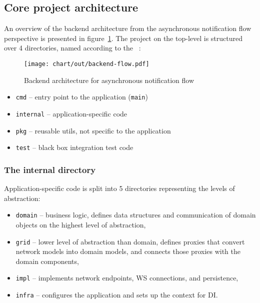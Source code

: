 \subsection{Core project architecture}\label{sec:core-project-architecture}

An overview of the backend architecture
from the asynchronous notification flow perspective
is presented in figure~\ref{fig:high-level-backend-flow}.
The project on the top-level is structured over 4 directories,
named according to
the ~\cite{quest_standard_2022}:

\begin{figure}[h]
      \centering
      \texttt{[image: chart/out/backend-flow.pdf]}
      \caption{Backend architecture for asynchronous notification flow}
      \label{fig:high-level-backend-flow}
\end{figure}

\begin{itemize}
      \item
            \texttt{cmd} -- entry point to the application (\texttt{main})
      \item
            \texttt{internal} -- application-specific code
      \item
            \texttt{pkg} -- reusable utils, not specific to the application
      \item
            \texttt{test} -- black box integration test code
\end{itemize}

\subsubsection{The internal directory}\label{sec:the-internal-directory}

Application-specific code is split into 5 directories
representing the levels of abstraction:

\begin{itemize}
      \item
            \texttt{domain} -- business logic,
            defines data structures and communication of domain objects
            on the highest level of abstraction,
      \item
            \texttt{grid} -- lower level of abstraction than domain,
            defines proxies that convert network models into domain models,
            and connects those proxies with the domain components,
      \item
            \texttt{impl} -- implements network endpoints,
            \ac{WS} connections, and persistence,
      \item
            \texttt{infra} -- configures the application
            and sets up the context for \ac{DI}.
\end{itemize}

